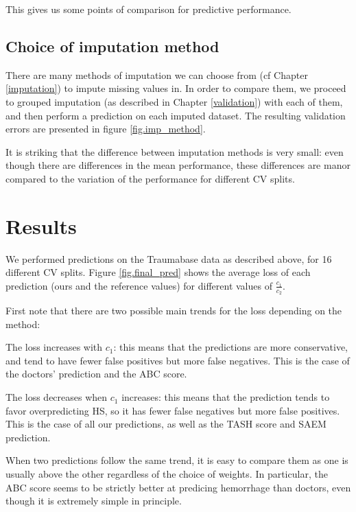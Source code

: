 This gives us some points of comparison for predictive performance.

		\subsection{Choice of imputation method}
There are many methods of imputation we can choose from (cf Chapter \ref{imputation}) to impute missing values in. In order to compare them, we proceed to grouped imputation (as described in Chapter \ref{validation}) with each of them, and then perform a prediction on each imputed dataset. The resulting validation errors are presented in figure \ref{fig.imp_method}.

%

It is striking that the difference between imputation methods is very small: even though there are differences in the mean performance, these differences are manor compared to the variation of the performance for different CV splits.

	\section{Results}
We performed predictions on the Traumabase data as described above, for 16 different CV splits. Figure \ref{fig.final_pred} shows the average loss of each prediction (ours and the reference values) for different values of $\frac{c_1}{c_2}$. 

%

First note that there are two possible main trends for the loss depending on the method:
\item The loss increases with $c_1$: this means that the predictions are more conservative, and tend to have fewer false positives but more false negatives. This is the case of the doctors' prediction and the ABC score.
\item The loss decreases when $c_1$ increases: this means that the prediction tends to favor overpredicting HS, so it has fewer false negatives but more false positives. This is the case of all our predictions, as well as the TASH score and SAEM prediction.

When two predictions follow the same trend, it is easy to compare them as one is usually above the other regardless of the choice of weights. In particular, the ABC score seems to be strictly better at predicing hemorrhage than doctors, even though it is extremely simple in principle.

